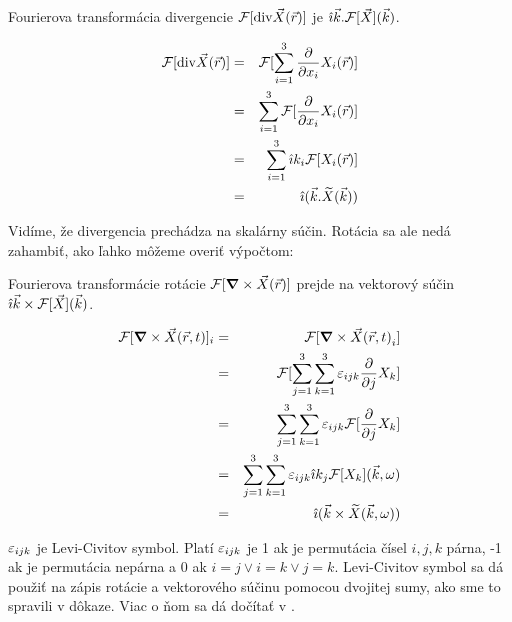 \begin{veta}
Fourierova transformácia divergencie
$\mathcal{F}[{\rm div}{\vec{X}}(\vec{r})]$  je $ \hat{\imath} \vec{k} .
\mathcal{F}[\vec{X}](\vec{k})$.
\end{veta}
\begin{dokaz}

\def\r{(\vektor{r})}
\def\k{(\vektor{k})}

\begin{eqnarray*}
    \fourier[\div{\vektor{X}\r}] &=& \fourier[\sum_{i=1}^3 \pd{}{x_i}
    X_i\r] \\
    &=& \sum_{i=1}^3 \fourier[ \pd{}{x_i} X_i\r]  \\
    &=& \sum_{i=1}^3 \imag k_i \fourier[X_i\r] \\
    &=& \imag ( \vektor{k} . \dual{X} \k)
\end{eqnarray*}
\end{dokaz}

Vidíme, že divergencia prechádza na skalárny súčin. Rotácia sa ale
nedá zahambiť, ako ľahko môžeme overiť výpočtom:


\begin{veta}
Fourierova transformácie rotácie 
$\mathcal{F}[\mbox{\boldmath$ \nabla $} \times \vec{X}(\vec{r})]$  prejde na vektorový súčin 
$ \hat{\imath} \vec{k} \times \mathcal{F}[\vec{X}](\vec{k})$.
\end{veta}

\begin{dokaz}
\begin{eqnarray*}
    \mathcal{F}[\mbox{\boldmath$ \nabla $} \times \vec{X}{(\vec{r},t)}]_i &=& 
    \mathcal{F}[\mbox{\boldmath$ \nabla $} \times \vec{X}{(\vec{r},t)}_i] \\
    &=& \mathcal{F}[\sum_{j=1}^3 \sum_{k=1}^3 \varepsilon_{ijk} \frac{\partial }{\partial j} X_k] \\
    &=& \sum_{j=1}^3 \sum_{k=1}^3 \varepsilon_{ijk} \mathcal{F}[\frac{\partial }{\partial j} X_k] \\
    &=& \sum_{j=1}^3 \sum_{k=1}^3 \varepsilon_{ijk} \hat{\imath} k_j \mathcal{F}[X_k]{(\vec{k},\omega)} \\
    &=& \hat{\imath} ( \vec{k} \times \widetilde{X}{(\vec{k},\omega)} )
\end{eqnarray*} 
\end{dokaz}

\begin{poznamka}
$\varepsilon_{ijk}$ je Levi-Civitov symbol. Platí $\varepsilon_{ijk}$ je 1 ak je
permutácia čísel $i,j,k$ párna, -1 ak je permutácia nepárna a 0 ak
$i=j \lor i=k \lor j=k$. Levi-Civitov symbol sa dá použiť na zápis
rotácie a vektorového súčinu pomocou dvojitej sumy, ako sme to
spravili v dôkaze. Viac o ňom sa dá dočítať v \todo{}.
\end{poznamka}


